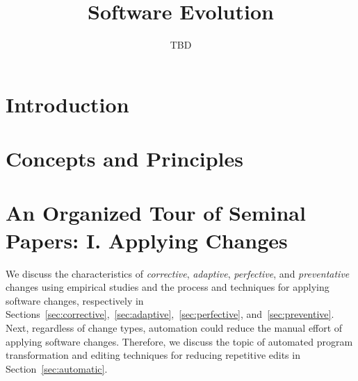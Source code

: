 \documentclass[runningheads,a4paper]{llncs}
\begin{document}
\mainmatter  %

\title{Software Evolution} 


%
%
\author{TBD} 

\institute{} 

\maketitle

\begin{abstract}

\end{abstract}

\section{Introduction}


\section{Concepts and Principles}
\label{sec:concepts}
\label{sec:classification} 


\section{An Organized Tour of Seminal Papers: I. Applying Changes}
\label{sec:apply}

We discuss the characteristics of {\em corrective}, {\em adaptive}, {\em perfective}, and {\em preventative} changes using empirical studies and the process and techniques for applying software changes, respectively in Sections~\ref{sec:corrective},~\ref{sec:adaptive},~\ref{sec:perfective}, and~\ref{sec:preventive}. Next, regardless of change types, automation could reduce the manual effort of applying software changes. Therefore, we discuss the topic of automated program transformation and editing techniques for reducing repetitive edits in Section~\ref{sec:automatic}.
\end{document}
